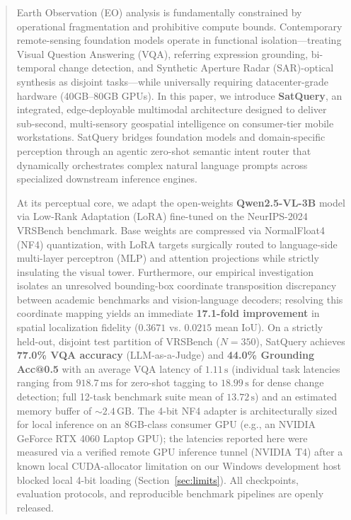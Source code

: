 \documentclass[lettersize,journal]{IEEEtran}
\begin{document}
\begin{abstract}
Earth Observation (EO) analysis is fundamentally constrained by operational fragmentation and prohibitive compute bounds. Contemporary remote-sensing foundation models operate in functional isolation---treating Visual Question Answering (VQA), referring expression grounding, bi-temporal change detection, and Synthetic Aperture Radar (SAR)-optical synthesis as disjoint tasks---while universally requiring datacenter-grade hardware (40GB--80GB GPUs). In this paper, we introduce \textbf{SatQuery}, an integrated, edge-deployable multimodal architecture designed to deliver sub-second, multi-sensory geospatial intelligence on consumer-tier mobile workstations. SatQuery bridges foundation models and domain-specific perception through an agentic zero-shot semantic intent router that dynamically orchestrates complex natural language prompts across specialized downstream inference engines. 

At its perceptual core, we adapt the open-weights \textbf{Qwen2.5-VL-3B} model via Low-Rank Adaptation (LoRA) fine-tuned on the NeurIPS-2024 VRSBench benchmark. Base weights are compressed via NormalFloat4 (NF4) quantization, with LoRA targets surgically routed to language-side multi-layer perceptron (MLP) and attention projections while strictly insulating the visual tower. Furthermore, our empirical investigation isolates an unresolved bounding-box coordinate transposition discrepancy between academic benchmarks and vision-language decoders; resolving this coordinate mapping yields an immediate \textbf{17.1-fold improvement} in spatial localization fidelity ($0.3671$ vs. $0.0215$ mean IoU). On a strictly held-out, disjoint test partition of VRSBench ($N=350$), SatQuery achieves \textbf{77.0\% VQA accuracy} (LLM-as-a-Judge) and \textbf{44.0\% Grounding Acc@0.5} with an average VQA latency of \textbf{$1.11\,\text{s}$} (individual task latencies ranging from $918.7\,\text{ms}$ for zero-shot tagging to $18.99\,\text{s}$ for dense change detection; full 12-task benchmark suite mean of $13.72\,\text{s}$) and an estimated memory buffer of $\sim 2.4\,\text{GB}$. The 4-bit NF4 adapter is architecturally sized for local inference on an 8GB-class consumer GPU (e.g., an NVIDIA GeForce RTX 4060 Laptop GPU); the latencies reported here were measured via a verified remote GPU inference tunnel (NVIDIA T4) after a known local CUDA-allocator limitation on our Windows development host blocked local 4-bit loading (Section~\ref{sec:limits}). All checkpoints, evaluation protocols, and reproducible benchmark pipelines are openly released.
\end{abstract}
\end{document}
